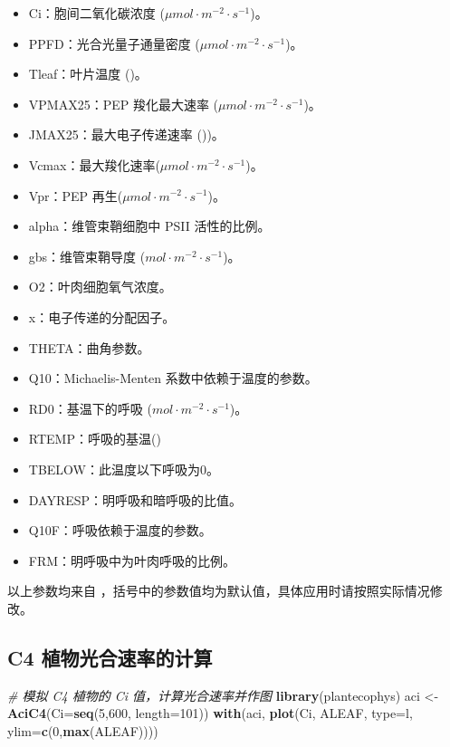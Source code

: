 \documentclass[
]{krantz}
\makeatletter
\newenvironment{Shaded}{\begin{snugshade}}{\end{snugshade}}
\newcommand{\CommentTok}[1]{\textcolor[rgb]{0.56,0.35,0.01}{\textit{#1}}}
\newcommand{\DataTypeTok}[1]{\textcolor[rgb]{0.13,0.29,0.53}{#1}}
\newcommand{\DecValTok}[1]{\textcolor[rgb]{0.00,0.00,0.81}{#1}}
\newcommand{\KeywordTok}[1]{\textcolor[rgb]{0.13,0.29,0.53}{\textbf{#1}}}
\newcommand{\NormalTok}[1]{#1}
\newcommand{\StringTok}[1]{\textcolor[rgb]{0.31,0.60,0.02}{#1}}
\providecommand{\tightlist}{%
  \setlength{\itemsep}{0pt}\setlength{\parskip}{0pt}}
\newenvironment{kframe}{%
\medskip{}
\setlength{\fboxsep}{.8em}
 \def\at@end@of@kframe{}%
 \ifinner\ifhmode%
  \def\at@end@of@kframe{\end{minipage}}%
  \begin{minipage}{\columnwidth}%
 \fi\fi%
 \def\FrameCommand##1{\hskip\@totalleftmargin \hskip-\fboxsep
 \colorbox{shadecolor}{##1}\hskip-\fboxsep
     \hskip-\linewidth \hskip-\@totalleftmargin \hskip\columnwidth}%
 \MakeFramed {\advance\hsize-\width
   \@totalleftmargin\z@ \linewidth\hsize
   \@setminipage}}%
 {\par\unskip\endMakeFramed%
 \at@end@of@kframe}
\renewenvironment{Shaded}{\begin{kframe}}{\end{kframe}}
\makeatother
\begin{document}
\begin{itemize}
\tightlist
\item
  Ci：胞间二氧化碳浓度 (\(\mu mol\cdot m^{-2}\cdot s^{-1}\))。
\item
  PPFD：光合光量子通量密度 (\(\mu mol\cdot m^{-2}\cdot s^{-1}\))。
\item
  Tleaf：叶片温度 (\textcelsius)。
\item
  VPMAX25：PEP 羧化最大速率 (\(\mu mol\cdot m^{-2}\cdot s^{-1}\))。
\item
  JMAX25：最大电子传递速率 (\textcelsius))。
\item
  Vcmax：最大羧化速率(\(\mu mol\cdot m^{-2}\cdot s^{-1}\))。
\item
  Vpr：PEP 再生(\(\mu mol\cdot m^{-2}\cdot s^{-1}\))。
\item
  alpha：维管束鞘细胞中 PSII 活性的比例。
\item
  gbs：维管束鞘导度 (\(mol\cdot m^{-2}\cdot s^{-1}\))。
\item
  O2：叶肉细胞氧气浓度。
\item
  x：电子传递的分配因子。
\item
  THETA：曲角参数。
\item
  Q10：Michaelis-Menten 系数中依赖于温度的参数。
\item
  RD0：基温下的呼吸 (\(mol\cdot m^{-2}\cdot s^{-1}\))。
\item
  RTEMP：呼吸的基温(\textcelsius)
\item
  TBELOW：此温度以下呼吸为0。
\item
  DAYRESP：明呼吸和暗呼吸的比值。
\item
  Q10F：呼吸依赖于温度的参数。
\item
  FRM：明呼吸中为叶肉呼吸的比例。
\end{itemize}

以上参数均来自 \citet{Caemmerer2000Biochemical}，括号中的参数值均为默认值，具体应用时请按照实际情况修改。

\hypertarget{c4_sim}{%
\subsection{C4 植物光合速率的计算}\label{c4_sim}}

\begin{Shaded}
\begin{Highlighting}[]
\CommentTok{\# 模拟 C4 植物的 Ci 值，计算光合速率并作图}
\KeywordTok{library}\NormalTok{(plantecophys)}
\NormalTok{aci \textless{}{-}}\StringTok{ }\KeywordTok{AciC4}\NormalTok{(}\DataTypeTok{Ci=}\KeywordTok{seq}\NormalTok{(}\DecValTok{5}\NormalTok{,}\DecValTok{600}\NormalTok{, }\DataTypeTok{length=}\DecValTok{101}\NormalTok{))}
\KeywordTok{with}\NormalTok{(aci, }\KeywordTok{plot}\NormalTok{(Ci, ALEAF, }\DataTypeTok{type=}\StringTok{\textquotesingle{}l\textquotesingle{}}\NormalTok{, }\DataTypeTok{ylim=}\KeywordTok{c}\NormalTok{(}\DecValTok{0}\NormalTok{,}\KeywordTok{max}\NormalTok{(ALEAF))))}
\end{Highlighting}
\end{Shaded}
\end{document}
